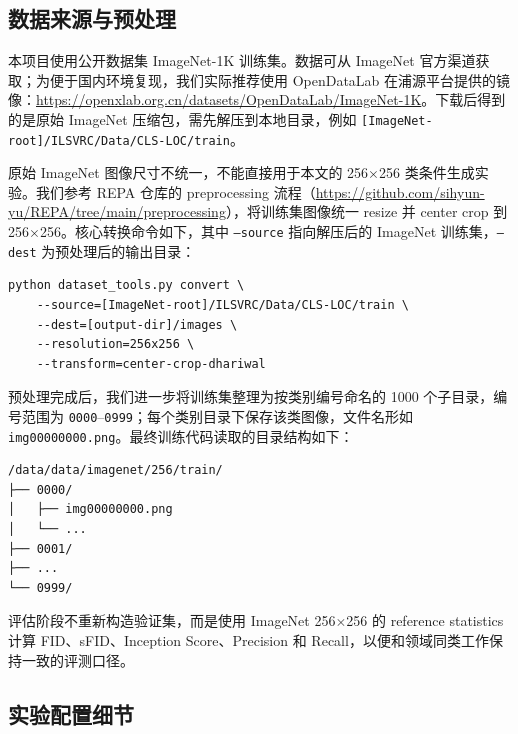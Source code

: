 \documentclass[11pt]{article}
\begin{document}
\subsection{数据来源与预处理}
\label{app:data-prep}

本项目使用公开数据集 ImageNet-1K 训练集。数据可从 ImageNet 官方渠道获取；为便于国内环境复现，我们实际推荐使用 OpenDataLab 在浦源平台提供的镜像：\url{https://openxlab.org.cn/datasets/OpenDataLab/ImageNet-1K}。下载后得到的是原始 ImageNet 压缩包，需先解压到本地目录，例如 \texttt{[ImageNet-root]/ILSVRC/Data/CLS-LOC/train}。

原始 ImageNet 图像尺寸不统一，不能直接用于本文的 256$\times$256 类条件生成实验。我们参考 REPA 仓库的 preprocessing 流程（\url{https://github.com/sihyun-yu/REPA/tree/main/preprocessing}），将训练集图像统一 resize 并 center crop 到 256$\times$256。核心转换命令如下，其中 \texttt{--source} 指向解压后的 ImageNet 训练集，\texttt{--dest} 为预处理后的输出目录：
\begin{verbatim}
python dataset_tools.py convert \
    --source=[ImageNet-root]/ILSVRC/Data/CLS-LOC/train \
    --dest=[output-dir]/images \
    --resolution=256x256 \
    --transform=center-crop-dhariwal
\end{verbatim}

预处理完成后，我们进一步将训练集整理为按类别编号命名的 1000 个子目录，编号范围为 \texttt{0000}--\texttt{0999}；每个类别目录下保存该类图像，文件名形如 \texttt{img00000000.png}。最终训练代码读取的目录结构如下：
\begin{verbatim}
/data/data/imagenet/256/train/
├── 0000/
│   ├── img00000000.png
│   └── ...
├── 0001/
├── ...
└── 0999/
\end{verbatim}
评估阶段不重新构造验证集，而是使用 ImageNet 256$\times$256 的 reference statistics 计算 FID、sFID、Inception Score、Precision 和 Recall，以便和领域同类工作保持一致的评测口径。

\subsection{实验配置细节}
\label{app:config-details}
\end{document}
